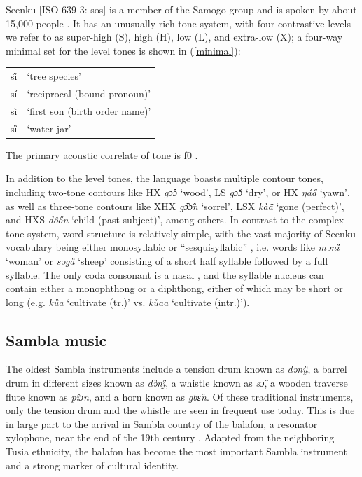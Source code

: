\documentclass[output=paper]{langscibook}
\begin{document}
Seenku [ISO 639-3: sos] is a member of the Samogo group and is spoken by about 15,000 people \citep{McPherson2020}. It has an unusually rich tone system, with four contrastive levels we refer to as super-high (S), high (H), low (L), and extra-low (X); a four-way minimal set for the level tones is shown in (\ref{minimal}):

\begin{exe}
  \ex\label{minimal} \begin{tabular}[t]{ll}
  si̋ &  `tree species' \\
sí  &  `reciprocal (bound pronoun)' \\
sì &  `first son (birth order name)' \\
sȉ &  `water jar'   \\
  \end{tabular}
\end{exe}




The primary acoustic correlate of tone is f0 \citep{McPherson2019b}.

In addition to the level tones, the language boasts multiple contour tones, including two-tone contours like HX \textit{gɔ̂ɔ} `wood', LS \textit{gɔ̌ɔ} `dry', or HX \textit{ŋáa̋} `yawn', as well as three-tone contours like XHX \textit{gɔ̏ɔ̂n} `sorrel', LSX \textit{kàä} `gone (perfect)', and HXS \textit{dôőn} `child (past subject)', among others. In contrast to the complex tone system, word structure is relatively simple, with the vast majority of Seenku vocabulary being either monosyllabic or ``sesquisyllabic'' \citep{Matisoff1990,Pittayaporn2015}, i.e. words like \textit{məni̋} `woman' or \textit{səgȁ} `sheep' consisting of a short half syllable followed by a full syllable. The only coda consonant is a nasal \citep{McPherson2020}, and the syllable nucleus can contain either a monophthong or a diphthong, either of which may be short or long (e.g. \textit{kȕa} `cultivate (tr.)' vs. \textit{kȕaa} `cultivate (intr.)').

\subsection{Sambla music}

The oldest Sambla instruments include a tension drum known as \textit{dənṵ̏}, a barrel drum in different sizes known as \textit{də̏nḭ̋}, a whistle known as \textit{sɔ̂}, a wooden traverse flute known as \textit{pîɔn}, and a horn known as \textit{gbɛ̂n}. Of these traditional instruments, only the tension drum and the whistle are seen in frequent use today. This is due in large part to the arrival in Sambla country of the balafon, a resonator xylophone, near the end of the 19th century \citep{Strand2009}. Adapted from the neighboring Tusia ethnicity, the balafon has become the most important Sambla instrument and a strong marker of cultural identity.
\end{document}
